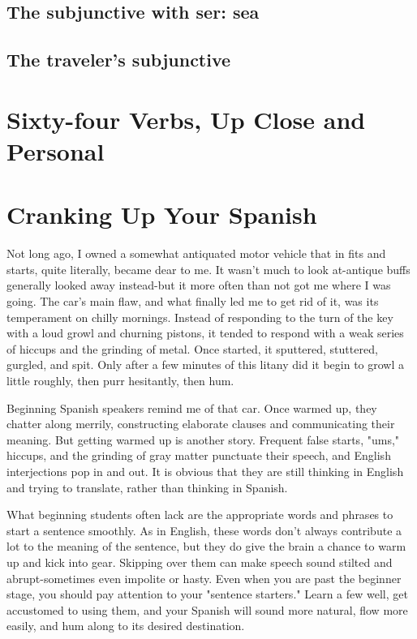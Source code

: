 \section{The subjunctive with ser: sea}
\section{The traveler's subjunctive}

\chapter{Sixty-four Verbs, Up Close and Personal}

\chapter{Cranking Up Your Spanish}

Not long ago, I owned a somewhat antiquated motor vehicle
that in fits and starts, quite literally, became dear to me. It wasn't
much to look at-antique buffs generally looked away instead-but
it more often than not got me where I was going. The car's main flaw,
and what finally led me to get rid of it, was its temperament on chilly
mornings. Instead of responding to the turn of the key with a loud
growl and churning pistons, it tended to respond with a weak series of
hiccups and the grinding of metal. Once started, it sputtered, stuttered,
gurgled, and spit. Only after a few minutes of this litany did it begin to
growl a little roughly, then purr hesitantly, then hum.

Beginning Spanish speakers remind me of that car. Once
warmed up, they chatter along merrily, constructing elaborate clauses
and communicating their meaning. But getting warmed up is another
story. Frequent false starts, "ums," hiccups, and the grinding of gray
matter punctuate their speech, and English interjections pop in and
out. It is obvious that they are still thinking in English and trying to
translate, rather than thinking in Spanish.

What beginning students often lack are the appropriate words
and phrases to start a sentence smoothly. As in English, these words
don't always contribute a lot to the meaning of the sentence, but they
do give the brain a chance to warm up and kick into gear. Skipping
over them can make speech sound stilted and abrupt-sometimes
even impolite or hasty. Even when you are past the beginner stage, you
should pay attention to your "sentence starters." Learn a few well, get
accustomed to using them, and your Spanish will sound more natural,
flow more easily, and hum along to its desired destination.

